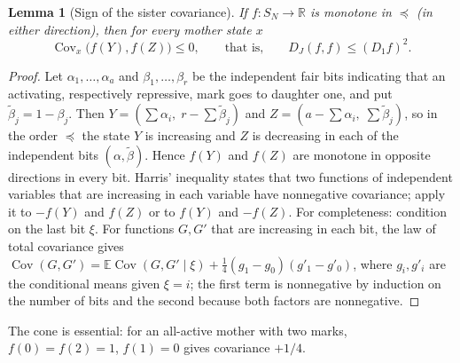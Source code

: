 \documentclass[11pt]{article}
\newtheorem{lemma}[theorem]{Lemma}
\theoremstyle{remark}
\newcommand{\E}{\mathbb E}
\newcommand{\Cov}{\operatorname{Cov}}
\begin{document}
\begin{lemma}[Sign of the sister covariance]\label{lem:assoc}
If $f:S_N\to\mathbb R$ is monotone in $\preceq$ \textup{(}in either
direction\textup{)}, then for every mother state $x$
\begin{equation}\label{eq:covsign}
 \Cov_x\bigl(f(Y),f(Z)\bigr)\le0,\qquad\text{that is,}\qquad D_J(f,f)\le(D_1f)^2 .
\end{equation}
\end{lemma}
\begin{proof}
Let $\alpha_1,\dots,\alpha_a$ and $\beta_1,\dots,\beta_r$ be the independent
fair bits indicating that an activating, respectively repressive, mark goes
to daughter one, and put $\tilde\beta_j=1-\beta_j$. Then
$Y=(\sum\alpha_i,\;r-\sum\tilde\beta_j)$ and
$Z=(a-\sum\alpha_i,\;\sum\tilde\beta_j)$, so in the order $\preceq$ the state
$Y$ is increasing and $Z$ is decreasing in each of the independent bits
$(\alpha,\tilde\beta)$. Hence $f(Y)$ and $f(Z)$ are monotone in opposite
directions in every bit. Harris' inequality \cite{harris1960,esary1967}
states that two functions of independent variables that are increasing in
each variable have nonnegative covariance; apply it to $-f(Y)$ and $f(Z)$
or to $f(Y)$ and $-f(Z)$. For completeness: condition on the last bit
$\xi$. For functions $G,G'$ that are increasing in each bit, the law of total
covariance gives
$\Cov(G,G')=\E\Cov(G,G'\mid\xi)+\tfrac14(g_1-g_0)(g'_1-g'_0)$, where $g_i,g'_i$
are the conditional means given $\xi=i$; the first term is nonnegative by
induction on the number of bits and the second because both factors are
nonnegative.
\end{proof}

The cone is essential: for an all-active mother with two marks,
$f(0)=f(2)=1$, $f(1)=0$ gives covariance $+1/4$.
\end{document}
